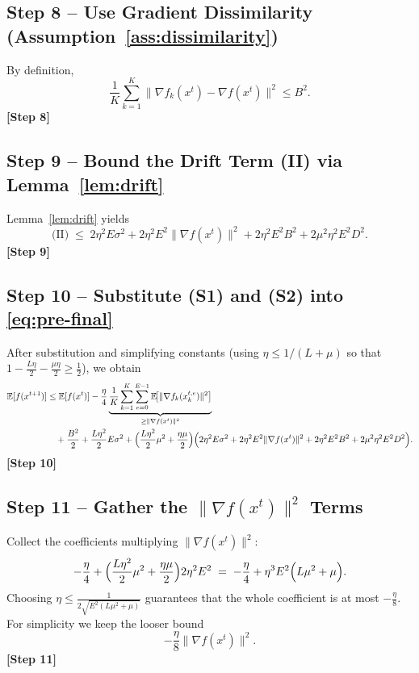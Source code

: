 \documentclass{article}
\begin{document}
\subsection*{Step 8 – Use Gradient Dissimilarity (Assumption~\ref{ass:dissimilarity})}
By definition,
\[
\frac{1}{K}\sum_{k=1}^{K}\|\nabla f_k(x^{t})-\nabla f(x^{t})\|^{2}\le B^{2}.
\tag{S1}
\]
\textbf{[Step 8]}

\subsection*{Step 9 – Bound the Drift Term (II) via Lemma~\ref{lem:drift}}
Lemma~\ref{lem:drift} yields
\[
\text{(II)}\;\le\;
2\eta^{2}E\sigma^{2}
+2\eta^{2}E^{2}\|\nabla f(x^{t})\|^{2}
+2\eta^{2}E^{2}B^{2}
+2\mu^{2}\eta^{2}E^{2}D^{2}.
\tag{S2}
\]
\textbf{[Step 9]}

\subsection*{Step 10 – Substitute (S1) and (S2) into \eqref{eq:pre-final}}
After substitution and simplifying constants (using $\eta\le 1/(L+\mu)$ so that $1-\frac{L\eta}{2}-\frac{\mu\eta}{2}\ge \frac12$), we obtain
\begin{align}
\mathbb{E}[f(x^{t+1})]
&\le \mathbb{E}[f(x^{t})]
   -\frac{\eta}{4}\underbrace{\frac{1}{K}\sum_{k=1}^{K}\sum_{e=0}^{E-1}
          \mathbb{E}\!\bigl[\|\nabla f_k(x_{k}^{t,e})\|^{2}\bigr]}_{\ge \|\nabla f(x^{t})\|^{2}} \nonumber\\
&\quad +\frac{B^{2}}{2}
   +\frac{L\eta^{2}}{2}E\sigma^{2}
   +\Bigl(\frac{L\eta^{2}}{2}\mu^{2}+\frac{\eta\mu}{2}\Bigr)
      \Bigl(2\eta^{2}E\sigma^{2}
            +2\eta^{2}E^{2}\|\nabla f(x^{t})\|^{2}
            +2\eta^{2}E^{2}B^{2}
            +2\mu^{2}\eta^{2}E^{2}D^{2}\Bigr). \label{eq:after-sub}
\end{align}
\textbf{[Step 10]}

\subsection*{Step 11 – Gather the $\|\nabla f(x^{t})\|^{2}$ Terms}
Collect the coefficients multiplying $\|\nabla f(x^{t})\|^{2}$:
\[
-\frac{\eta}{4}
   +\Bigl(\frac{L\eta^{2}}{2}\mu^{2}+\frac{\eta\mu}{2}\Bigr)2\eta^{2}E^{2}
\;=\;
-\frac{\eta}{4}+ \eta^{3}E^{2}\Bigl(L\mu^{2}+ \mu\Bigr).
\]
Choosing $\eta\le \frac{1}{2\sqrt{E^{2}(L\mu^{2}+\mu)}}$ guarantees that the whole coefficient is at most $-\frac{\eta}{8}$.  For simplicity we keep the looser bound
\[
-\frac{\eta}{8}\|\nabla f(x^{t})\|^{2}.
\tag{S3}
\]
\textbf{[Step 11]}
\end{document}

